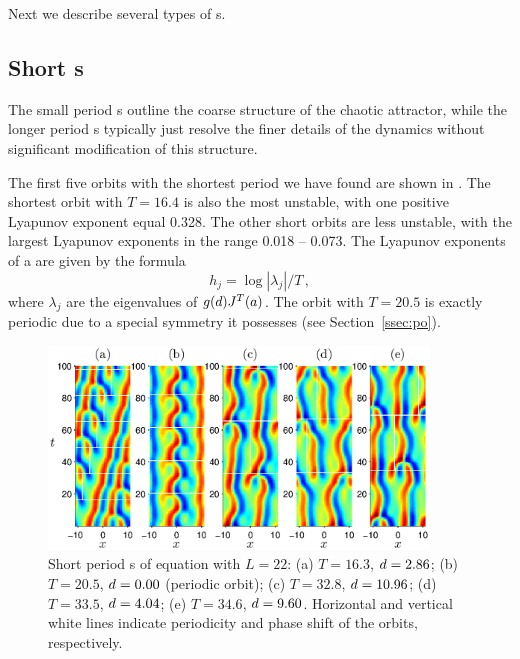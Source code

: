 Next we describe several types of \rpo s.

\subsection{Short \rpo s}  The small period \rpo s outline the
coarse structure of the chaotic attractor, while the longer period
\rpo s typically just resolve the finer details of the dynamics
without significant modification of this structure.

The first five orbits with the shortest period we have found are
shown in .  The shortest orbit with $T =
16.4$ is also the most unstable, with one positive Lyapunov exponent
equal 0.328.  The other short orbits are less unstable, with the
largest Lyapunov exponents in the range 0.018 -- 0.073.  The
Lyapunov exponents of a \rpo are given by the formula
\[h_j = \log |\lambda_j|/T\,,\]
where $\lambda_j$ are the eigenvalues of $g(d)J^T(a)$.  The
orbit with $T = 20.5$ is exactly periodic due to a special symmetry
it possesses (see Section~\ref{ssec:po}).

\begin{figure}[t]
\begin{center}
\includegraphics[width=0.9\textwidth]{figs/ks22rposShort.eps}
\end{center}
\caption{Short period \rpo s of \KS equation with $L = 22$: (a) $T =
16.3$, $d = 2.86$; (b) $T = 20.5$, $d = 0.00$ (periodic
orbit); (c) $T = 32.8$, $d = 10.96$; (d) $T = 33.5$, $d =
4.04$; (e) $T = 34.6$, $d = 9.60$.  Horizontal and vertical
white lines indicate periodicity and phase shift of the orbits,
respectively. }\label{f:ks22rposShort}
\end{figure}



